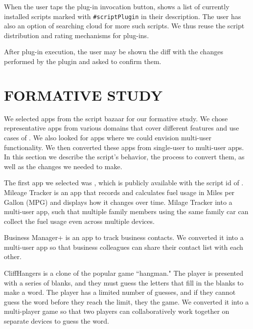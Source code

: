 \documentclass[article]{sigplanconf}
\begin{document}
When the user taps the plug-in invocation button, \TD shows a list of currently
installed scripts marked with \texttt{\#scriptPlugin} in their description.
The user has also an option of searching \TD cloud for more such scripts.
We thus reuse the script distribution and rating mechanisms for plug-ins.

After plug-in execution, the user may be shown the diff with the changes performed
by the plugin and asked to confirm them.

\section{FORMATIVE STUDY}
\label{sec:Formative}

We selected \numFormative apps from the \TD script bazaar for our formative study. 
We chose representative apps from various domains that cover different features and use cases of \TD.  We also looked for apps where we could envision multi-user functionality.
We then converted these apps from single-user to multi-user apps. In this section we describe the script's behavior, the process to convert them, as well as the changes we needed to make.

The first app we selected was \MT, which is publicly available with the script id of
.  Mileage Tracker is an app that records and calculates fuel usage in Miles per Gallon (MPG) and displays how it changes over time.  Milage Tracker into a multi-user app, such that multiple family members using the same family car can collect the fuel usage even across multiple devices.

Business Manager+ is an app to track business contacts.  We converted it into a multi-user app so that business colleagues can share their contact list with each other.

CliffHangers is a clone of the popular game ``hangman."  The player is presented with a series of blanks, and they must guess the letters that fill in the blanks to make a word.  The player has a limited number of guesses, and if they cannot guess the word before they reach the limit, they  the game.  We converted it into a multi-player game so that two players can collaboratively work together on separate devices to guess the word.
\end{document}

